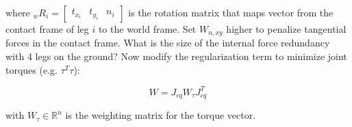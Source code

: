 \documentclass{report}
\newcommand{\Rnum}{\mathbb{R}} %
\newcommand{\mat}[1]{\ensuremath{\begin{bmatrix}#1\end{bmatrix}}}	%
\begin{document}
%
where ${}_wR_i=\mat{t_{x_i} & t_{y_i} & n_i}$ is the rotation matrix that maps vector from the contact frame of leg $i$ to the world frame.
Set $W_{n,xy}$  higher to penalize tangential forces in the contact frame.
What is the size of the internal force redundancy with 4 legs on the ground? 
Now modify the regularization term to minimize joint torques (e.g. $\tau^T\tau$):

\begin{equation}
W = J_{cq} W_{\tau}  J_{cq}^T
\end{equation}

with $W_\tau \in \Rnum^n$ is the weighting matrix for the torque vector.
\end{document}
